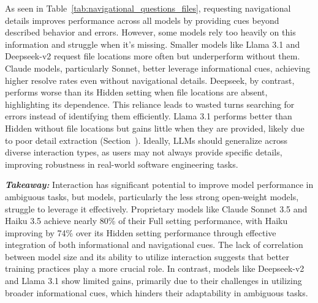 As seen in Table~\ref{tab:navigational_questions_files}, requesting navigational details improves performance across all models by providing cues beyond described behavior and errors. However, some models rely too heavily on this information and struggle when it’s missing. Smaller models like Llama 3.1 and Deepseek-v2 request file locations more often but underperform without them. Claude models, particularly Sonnet, better leverage informational cues, achieving higher resolve rates even without navigational details. Deepseek, by contrast, performs worse than its Hidden setting when file locations are absent, highlighting its dependence. This reliance leads to wasted turns searching for errors instead of identifying them efficiently. Llama 3.1 performs better than Hidden without file locations but gains little when they are provided, likely due to poor detail extraction (Section~). Ideally, LLMs should generalize across diverse interaction types, as users may not always provide specific details, improving robustness in real-world software engineering tasks.

\textbf{\textit{Takeaway:}} Interaction has significant potential to improve model performance in ambiguous tasks, but models, particularly the less strong open-weight models, struggle to leverage it effectively. Proprietary models like Claude Sonnet 3.5 and Haiku 3.5 achieve nearly 80\% of their Full setting performance, with Haiku improving by 74\% over its Hidden setting performance through effective integration of both informational and navigational cues. The lack of correlation between model size and its ability to utilize interaction suggests that better training practices play a more crucial role. In contrast, models like Deepseek-v2 and Llama 3.1 show limited gains, primarily due to their challenges in utilizing broader informational cues, which hinders their adaptability in ambiguous tasks.








